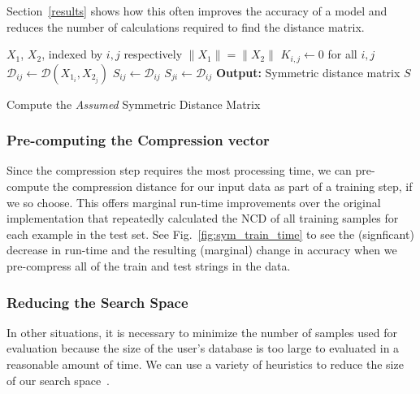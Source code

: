\documentclass{article}
\begin{document}
 Section~\ref{results} shows how this often improves the accuracy of a model and reduces the number of calculations required to find the distance matrix.



\begin{algorithm}
    \begin{algorithmic}
        \Require $X_1$, $X_2$, indexed by $i,j$ respectively
        \Ensure $ \| X_1 \| = \| X_2 \| $
        \State $K_{i,j} \gets 0$ for all $i, j$
            \State $\mathcal{D}_{ij} \gets \mathcal{D}(X_{1_i}, X_{2_j})$ \;
            \State $S_{ij} \gets \mathcal{D}_{ij}$ \;
            \State $S_{ji} \gets \mathcal{D}_{ij}$ \;
        \State \textbf{Output:} Symmetric distance matrix $S$
    \end{algorithmic}
    \caption{Compute the \textit{Assumed} Symmetric Distance Matrix}
    \label{alg:assumed_symmetry}
\end{algorithm}



\subsubsection{Pre-computing the Compression vector}
Since the compression step requires the most processing time, we can pre-compute the compression distance for our input data as part of a training step, if we so choose. This offers marginal run-time improvements over the original implementation that repeatedly calculated the NCD of all training samples for each example in the test set. 
See Fig.~\ref{fig:sym_train_time} to see the (signficant) decrease in run-time  and the resulting (marginal) change in accuracy when we pre-compress all of the train and test strings in the data. %










\subsubsection{Reducing the Search Space}
\label{best-samples}
In other situations, it is necessary to minimize the number of samples used for evaluation because the size of the user's database is too large to evaluated in a reasonable amount of time. We can use a variety of heuristics to reduce the size of our search space~\cite{amal2011survey}. 
\end{document}
